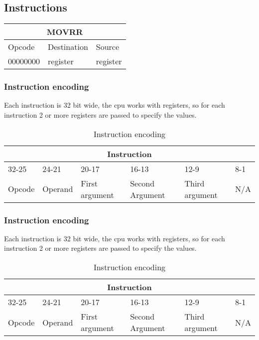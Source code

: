 \documentclass{article}
\begin{document}
\subsection{Instructions}
\begin{table}[h!]
\centering
\begin{tabular} { | p{2cm} | | p{2cm} | p{2cm} |}
  \hline
  \multicolumn{3}{|c|}{MOVRR}\\
  \hline
  Opcode & Destination & Source\\
  \hline
  00000000 & register & register\\
  \hline
\end{tabular}
\end{table}

\subsubsection{Instruction encoding}
Each instruction is 32 bit wide, the cpu works with registers, so for each instruction 2 or more registers are passed to specify the values.
\begin{table}[h!]
\centering
\begin{tabular} { | p{2cm} | | p{2cm} | p{3cm} | | p{3cm} | | p{3cm}| | p{3cm} |}
  \hline
  \multicolumn{6}{|c|}{Instruction}\\
  \hline
  32-25 & 24-21 & 20-17 & 16-13 & 12-9 & 8-1\\
  \hline
  Opcode & Operand & First argument & Second Argument & Third argument & N/A\\
  \hline
\end{tabular}
\caption{Instruction encoding}
\end{table}
\subsubsection{Instruction encoding}
Each instruction is 32 bit wide, the cpu works with registers, so for each instruction 2 or more registers are passed to specify the values.
\begin{table}[h!]
\centering
\begin{tabular} { | p{2cm} | | p{2cm} | p{3cm} | | p{3cm} | | p{3cm}| | p{3cm} |}
  \hline
  \multicolumn{6}{|c|}{Instruction}\\
  \hline
  32-25 & 24-21 & 20-17 & 16-13 & 12-9 & 8-1\\
  \hline
  Opcode & Operand & First argument & Second Argument & Third argument & N/A\\
  \hline
\end{tabular}
\caption{Instruction encoding}
\end{table}
\end{document}
